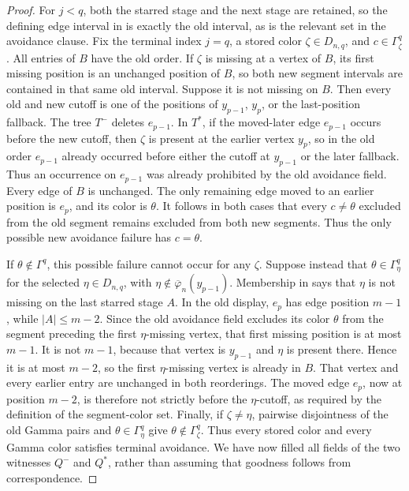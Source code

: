 \begin{proof}
For \(j<q\), both the starred stage and the next stage are retained, so
the defining edge interval in  is
exactly the old interval, as is the relevant
 set in the
 avoidance clause.
Fix the terminal index \(j=q\), a stored color \(\zeta\in D_{n,q}\),
and \(c\in\Gamma^q_\zeta\).  All entries of \(B\) have the old order.
If \(\zeta\) is missing at a vertex of \(B\), its first missing position
is an unchanged position of \(B\), so both new segment intervals are
contained in that same old interval.  Suppose it is not missing on
\(B\).  Then every old and new cutoff is one of the positions of
\(y_{p-1}\), \(y_p\), or the last-position fallback.  The tree \(T^-\)
deletes \(e_{p-1}\).  In \(T^*\), if the moved-later edge
\(e_{p-1}\) occurs before the new cutoff, then \(\zeta\) is present at
the earlier vertex \(y_p\), so in the old order \(e_{p-1}\) already
occurred before either the cutoff at \(y_{p-1}\) or the later fallback.
Thus an occurrence on \(e_{p-1}\) was already prohibited by the old
avoidance field.  Every edge of \(B\) is unchanged.  The only remaining
edge moved to an earlier position is \(e_p\), and its color is
\(\theta\).  It follows in both cases that every \(c\ne\theta\) excluded
from the old segment remains excluded from both new segments.  Thus the
only possible new avoidance failure has \(c=\theta\).

If \(\theta\notin\Gamma^q\), this possible failure cannot occur for any
\(\zeta\).  Suppose instead that
\(\theta\in\Gamma^q_\eta\) for the selected
\(\eta\in D_{n,q}\), with
\(\eta\notin\overline\varphi_n(y_{p-1})\).  Membership in
 says that \(\eta\) is not missing on
the last starred stage \(A\).  In the old display, \(e_p\) has edge
position \(m-1\), while \(|A|\leq m-2\).  Since the old avoidance field
excludes its color \(\theta\) from the segment preceding the first
\(\eta\)-missing vertex, that first missing position is at most
\(m-1\).  It is not \(m-1\), because that vertex is
\(y_{p-1}\) and \(\eta\) is present there.  Hence it is at most
\(m-2\), so the first \(\eta\)-missing vertex is already in \(B\).
That vertex and every earlier entry are unchanged in both reorderings.
The moved edge \(e_p\), now at position \(m-2\), is therefore not
strictly before the \(\eta\)-cutoff, as required by the definition of
the segment-color set.  Finally, if \(\zeta\ne\eta\), pairwise
disjointness of the old Gamma pairs and
\(\theta\in\Gamma^q_\eta\) give
\(\theta\notin\Gamma^q_\zeta\).  Thus every stored color and every
Gamma color satisfies terminal avoidance.  We have now filled all
fields of the two witnesses \(Q^-\) and \(Q^*\), rather than assuming
that goodness follows from correspondence.


\end{proof}

